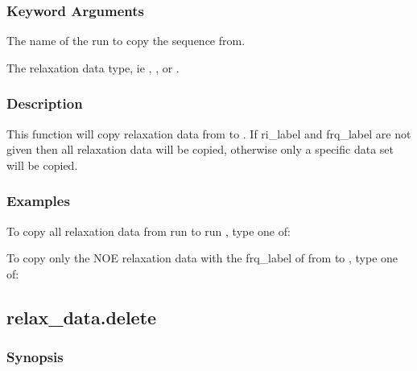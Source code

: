 \subsubsection{Keyword Arguments}

  The name of the run to copy the sequence from.

  The relaxation data type, ie 
, 
, or 
.


\subsubsection{Description}

This function will copy relaxation data from 
 to 
.  If ri\_label and frq\_label
are not given then all relaxation data will be copied, otherwise only a specific data set
will be copied.


\subsubsection{Examples}

To copy all relaxation data from run 
 to run 
, type one of:






To copy only the NOE relaxation data with the frq\_label of 
 from 
 to 
, type one
of:





\newpage

\subsection{relax\_data.delete}


\subsubsection{Synopsis}

